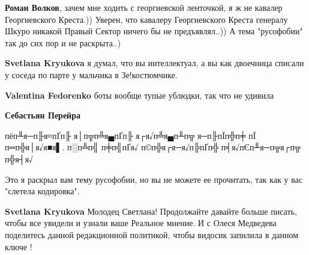 \begin{itemize}
\begin{itemize}
\textbf{Роман Волков}, зачем мне ходить с георгиевской ленточкой, я ж не кавалер Георгиевского Креста.)) Уверен, что кавалеру Георгиевского Креста генералу Шкуро никакой Правый Сектор ничего бы не предъявлял..)) А тема "русофобии" так до сих пор и не раскрыта..)

 
\textbf{Svetlana Kryukova} я думал, что вы интеллектуал, а вы как двоечница списали у соседа по парте у мальчика в Зе!костюмчике.

 
\textbf{Valentina Fedorenko} боты вообще тупые ублюдки, так что не удивила

 
\textbf{Себастьян Перейра} 

пёп╨я─п╟я≈пҐп╟ я│п╦п╩я▄пҐп╟ я┌я√п╩я▄п╨п╦ я─п╟пЇп╬п╪ пЇ п═п╬я│я√я■я▌. 
п░п╩п╣ п╪п╣пҐя√ п©п╬я┌я─я√п╠пҐп╬ п╡я√пЄп╨я─п╦я┌п╦ п╬я┤я√

Это я раскрыл вам тему русофобии, но вы не можете ее прочитать, так как у вас
"слетела кодировка".

 
\textbf{Svetlana Kryukova} Молодец Светлана! Продолжайте давайте больше писать, чтобы все увидели и узнали ваше Реальное мнение. И с Олеся Медведева поделитесь данной редакционной политикой, чтобы видосик запилила в данном ключе !

 

\end{itemize}
\end{itemize}
